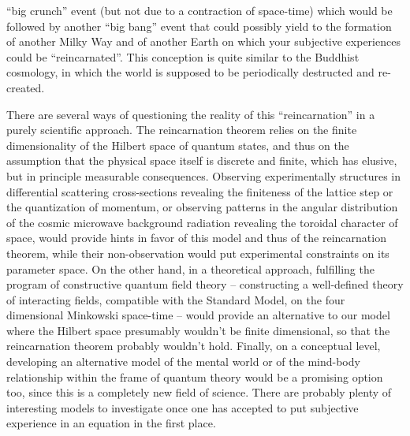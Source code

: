 ``big crunch'' event (but not due to a contraction of space-time) which would be followed by another ``big bang'' event that could possibly yield to the formation of another Milky Way and of another Earth on which your subjective experiences could be ``reincarnated''. This conception is quite similar to the Buddhist cosmology, in which the world is supposed to be periodically destructed and re-created.

There are several ways of questioning the reality of this ``reincarnation'' in a purely scientific approach. The reincarnation theorem relies on the finite dimensionality of the Hilbert space of quantum states, and thus on the assumption that the physical space itself is discrete and finite, which has elusive, but in principle measurable consequences. Observing experimentally structures in differential scattering cross-sections revealing the finiteness of the lattice step or the quantization of momentum, or observing patterns in the angular distribution of the cosmic microwave background radiation revealing the toroidal character of space, would provide hints in favor of this model and thus of the reincarnation theorem, while their non-observation would put experimental constraints on its parameter space. On the other hand, in a theoretical approach, fulfilling the program of constructive quantum field theory -- constructing a well-defined theory of interacting fields, compatible with the Standard Model, on the four dimensional Minkowski space-time -- would provide an alternative to our model where the Hilbert space presumably wouldn't be finite dimensional, so that the reincarnation theorem probably wouldn't hold. Finally, on a conceptual level, developing an alternative model of the mental world or of the mind-body relationship within the frame of quantum theory would be a promising option too, since this is a completely new field of science. There are probably plenty of interesting models to investigate once one has accepted to put subjective experience in an equation in the first place.






